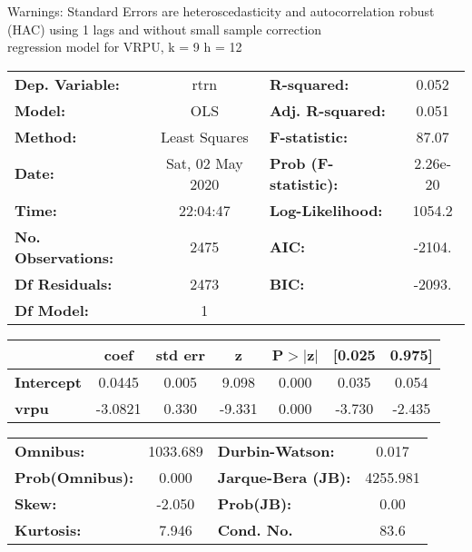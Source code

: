 Warnings: \newline
 [1] Standard Errors are heteroscedasticity and autocorrelation robust (HAC) using 1 lags and without small sample correction\\ 

regression model for VRPU, k = 9 h = 12\begin{center}
\begin{tabular}{lclc}
\toprule
\textbf{Dep. Variable:}    &       rtrn       & \textbf{  R-squared:         } &     0.052   \\
\textbf{Model:}            &       OLS        & \textbf{  Adj. R-squared:    } &     0.051   \\
\textbf{Method:}           &  Least Squares   & \textbf{  F-statistic:       } &     87.07   \\
\textbf{Date:}             & Sat, 02 May 2020 & \textbf{  Prob (F-statistic):} &  2.26e-20   \\
\textbf{Time:}             &     22:04:47     & \textbf{  Log-Likelihood:    } &    1054.2   \\
\textbf{No. Observations:} &        2475      & \textbf{  AIC:               } &    -2104.   \\
\textbf{Df Residuals:}     &        2473      & \textbf{  BIC:               } &    -2093.   \\
\textbf{Df Model:}         &           1      & \textbf{                     } &             \\
\bottomrule
\end{tabular}
\begin{tabular}{lcccccc}
                   & \textbf{coef} & \textbf{std err} & \textbf{z} & \textbf{P$> |$z$|$} & \textbf{[0.025} & \textbf{0.975]}  \\
\midrule
\textbf{Intercept} &       0.0445  &        0.005     &     9.098  &         0.000        &        0.035    &        0.054     \\
\textbf{vrpu}      &      -3.0821  &        0.330     &    -9.331  &         0.000        &       -3.730    &       -2.435     \\
\bottomrule
\end{tabular}
\begin{tabular}{lclc}
\textbf{Omnibus:}       & 1033.689 & \textbf{  Durbin-Watson:     } &    0.017  \\
\textbf{Prob(Omnibus):} &   0.000  & \textbf{  Jarque-Bera (JB):  } & 4255.981  \\
\textbf{Skew:}          &  -2.050  & \textbf{  Prob(JB):          } &     0.00  \\
\textbf{Kurtosis:}      &   7.946  & \textbf{  Cond. No.          } &     83.6  \\
\bottomrule
\end{tabular}
\end{center}

